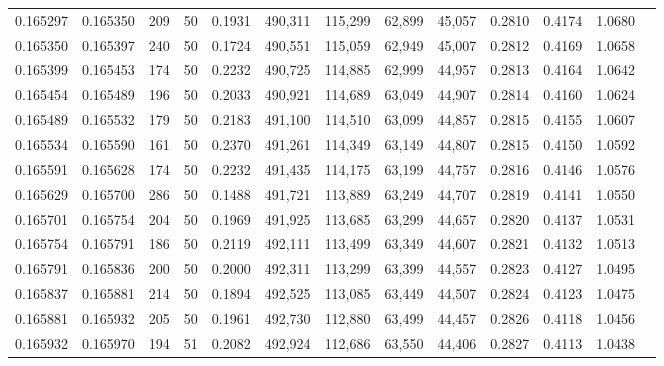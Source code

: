 \begin{tabular}{rrrrrrrrrrrrr}
0.165297 & 0.165350 &   209 &  50 &                                     0.1931 & 490,311 & 115,299 &  62,899 &  45,057 & 0.2810 & 0.4174 & 1.0680 \\
0.165350 & 0.165397 &   240 &  50 &                                     0.1724 & 490,551 & 115,059 &  62,949 &  45,007 & 0.2812 & 0.4169 & 1.0658 \\
0.165399 & 0.165453 &   174 &  50 &                                     0.2232 & 490,725 & 114,885 &  62,999 &  44,957 & 0.2813 & 0.4164 & 1.0642 \\
0.165454 & 0.165489 &   196 &  50 &                                     0.2033 & 490,921 & 114,689 &  63,049 &  44,907 & 0.2814 & 0.4160 & 1.0624 \\
0.165489 & 0.165532 &   179 &  50 &                                     0.2183 & 491,100 & 114,510 &  63,099 &  44,857 & 0.2815 & 0.4155 & 1.0607 \\
0.165534 & 0.165590 &   161 &  50 &                                     0.2370 & 491,261 & 114,349 &  63,149 &  44,807 & 0.2815 & 0.4150 & 1.0592 \\
0.165591 & 0.165628 &   174 &  50 &                                     0.2232 & 491,435 & 114,175 &  63,199 &  44,757 & 0.2816 & 0.4146 & 1.0576 \\
0.165629 & 0.165700 &   286 &  50 &                                     0.1488 & 491,721 & 113,889 &  63,249 &  44,707 & 0.2819 & 0.4141 & 1.0550 \\
0.165701 & 0.165754 &   204 &  50 &                                     0.1969 & 491,925 & 113,685 &  63,299 &  44,657 & 0.2820 & 0.4137 & 1.0531 \\
0.165754 & 0.165791 &   186 &  50 &                                     0.2119 & 492,111 & 113,499 &  63,349 &  44,607 & 0.2821 & 0.4132 & 1.0513 \\
0.165791 & 0.165836 &   200 &  50 &                                     0.2000 & 492,311 & 113,299 &  63,399 &  44,557 & 0.2823 & 0.4127 & 1.0495 \\
0.165837 & 0.165881 &   214 &  50 &                                     0.1894 & 492,525 & 113,085 &  63,449 &  44,507 & 0.2824 & 0.4123 & 1.0475 \\
0.165881 & 0.165932 &   205 &  50 &                                     0.1961 & 492,730 & 112,880 &  63,499 &  44,457 & 0.2826 & 0.4118 & 1.0456 \\
0.165932 & 0.165970 &   194 &  51 &                                     0.2082 & 492,924 & 112,686 &  63,550 &  44,406 & 0.2827 & 0.4113 & 1.0438 \\

\end{tabular}

